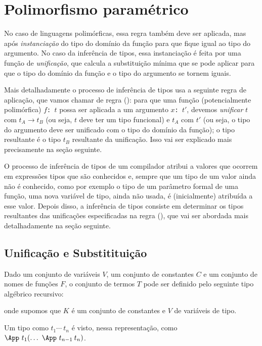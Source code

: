 
\section{Polimorfismo paramétrico}

No caso de linguagens polimórficas, essa regra também deve ser
aplicada, mas após {\em instanciação\/} do tipo do domínio da função
para que fique igual ao tipo do argumento. No caso da inferência de
tipos, essa instanciação é feita por uma função de {\em unificação\/},
que calcula a substituição mínima que se pode aplicar para que o tipo
do domínio da função e o tipo do argumento se tornem iguais.

Mais detalhadamente o processo de inferência de tipos usa a seguinte
regra de aplicação, que vamos chamar de regra (\APL): para que uma
função (potencialmente polimórfica) {\tt $f$: $t$} possa ser aplicada
a um argumento {\tt $x$: $t'$}, devemos {\em unificar\/} $t$ com
$t_A\rightarrow t_B$ (ou seja, $t$ deve ter um tipo funcional) e $t_A$
com $t'$ (ou seja, o tipo do argumento deve ser unificado com o tipo
do domínio da função); o tipo resultante é o tipo $t_B$ resultante da
unificação. Isso vai ser explicado mais precisamente na seção
seguinte.

O processo de inferência de tipos de um compilador atribui a valores
que ocorrem em expressões tipos que são conhecidos e, sempre que um
tipo de um valor ainda não é conhecido, como por exemplo o tipo de um
parâmetro formal de uma função, uma nova variável de tipo, ainda não
usada, é (inicialmente) atribuída a esse valor. Depois disso, a
inferência de tipos consiste em determinar os tipos resultantes das
unificações especificadas na regra (\APL), que vai ser abordada mais
detalhadamente na seção seguinte.

\subsection{Unificação e Substitituição}

Dado um conjunto de variáveis $V$, um conjunto de constantes $C$ e um
conjunto de nomes de funções $F$, o conjunto de termos $T$ pode ser
definido pelo seguinte tipo algébrico recursivo:

onde supomos que $K$ é um conjunto de constantes e $V$ de variáveis de
tipo.

Um tipo como $t_1 \cdots\ t_n$ é visto, nessa representação, como
 $\App\ t_1 (\ldots\ \App\ t_{n-1}\: t_n)$.
 
